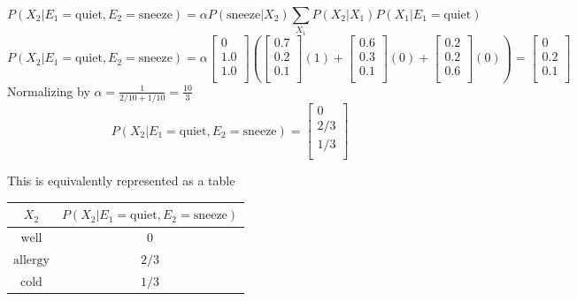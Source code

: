 \documentclass[12pt]{article}
\begin{document}
\begin{enumerate}
  \[
    P(X_2|E_1=\text{quiet},E_2=\text{sneeze}) = \alpha P(\text{sneeze}|X_2) \sum_{X_1} {P(X_2|X_1) P(X_1|E_1=\text{quiet})}
  \]
  \[
    P(X_2|E_1=\text{quiet},E_2=\text{sneeze}) = 
    \alpha
    \begin{bmatrix}
      0 \\
      1.0 \\
      1.0 \\
    \end{bmatrix}
    (
    \begin{bmatrix}
      0.7 \\
      0.2 \\
      0.1 \\
    \end{bmatrix}
    (1)+
    \begin{bmatrix}
      0.6 \\
      0.3 \\
      0.1 \\
    \end{bmatrix}
    (0)+
    \begin{bmatrix}
      0.2 \\
      0.2 \\
      0.6 \\
    \end{bmatrix}
    (0)
    )=
    \begin{bmatrix}
      0 \\
      0.2 \\
      0.1 \\
    \end{bmatrix}
  \]
  Normalizing by $\alpha = \frac{1}{2/10 + 1/10} = \frac{10}{3}$
  \[
    P(X_2|E_1=\text{quiet},E_2=\text{sneeze}) =  
    \begin{bmatrix}
      0 \\
      2/3 \\
      1/3 \\
    \end{bmatrix}
  \]

  This is equivalently represented as a table

  \begin{center}
    \begin{tabular}{|c|c|}
      \hline
      $X_2$ & $P(X_2|E_1=\text{quiet},E_2=\text{sneeze})$ \\
      \hline
      $\text{well}$ & 0 \\
      \hline
      $\text{allergy}$ & $2/3$ \\
      \hline
      $\text{cold}$ & $1/3$ \\
      \hline
    \end{tabular}
  \end{center}


\end{enumerate}
\end{document}
